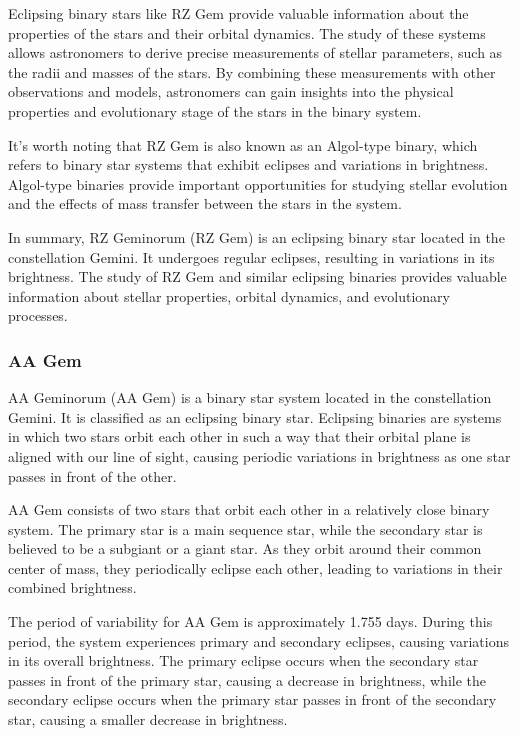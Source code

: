 Eclipsing binary stars like RZ Gem provide valuable information about the properties of the stars and their orbital dynamics. The study of these systems allows astronomers to derive precise measurements of stellar parameters, such as the radii and masses of the stars. By combining these measurements with other observations and models, astronomers can gain insights into the physical properties and evolutionary stage of the stars in the binary system.

It's worth noting that RZ Gem is also known as an Algol-type binary, which refers to binary star systems that exhibit eclipses and variations in brightness. Algol-type binaries provide important opportunities for studying stellar evolution and the effects of mass transfer between the stars in the system.

In summary, RZ Geminorum (RZ Gem) is an eclipsing binary star located in the constellation Gemini. It undergoes regular eclipses, resulting in variations in its brightness. The study of RZ Gem and similar eclipsing binaries provides valuable information about stellar properties, orbital dynamics, and evolutionary processes.

\subsubsection*{ AA Gem }
AA Geminorum (AA Gem) is a binary star system located in the constellation Gemini. It is classified as an eclipsing binary star. Eclipsing binaries are systems in which two stars orbit each other in such a way that their orbital plane is aligned with our line of sight, causing periodic variations in brightness as one star passes in front of the other.

AA Gem consists of two stars that orbit each other in a relatively close binary system. The primary star is a main sequence star, while the secondary star is believed to be a subgiant or a giant star. As they orbit around their common center of mass, they periodically eclipse each other, leading to variations in their combined brightness.

The period of variability for AA Gem is approximately 1.755 days. During this period, the system experiences primary and secondary eclipses, causing variations in its overall brightness. The primary eclipse occurs when the secondary star passes in front of the primary star, causing a decrease in brightness, while the secondary eclipse occurs when the primary star passes in front of the secondary star, causing a smaller decrease in brightness.

